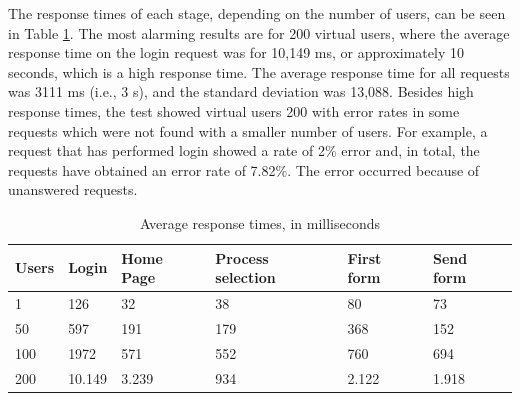 \documentclass[runningheads,a4paper]{llncs}
\begin{document}
{%


The response times of each stage, depending on the number of users, can be seen in Table \ref{tab:resultadoCarga}. The most alarming results are for 200 virtual users, where the average response time on the login request was for 10,149 ms, or approximately 10 seconds, which is a high response time. The average response time for all requests was 3111 ms (i.e., 3 s), and the standard deviation was 13,088. Besides high response times, the test showed virtual users 200 with error rates in some requests which were not found with a smaller number of users. For example, a request that has performed login showed a rate of 2\% error and, in total, the requests have obtained an error rate of 7.82\%. The error occurred because of unanswered requests.


\begin{table}
{\scriptsize
\centering
\begin{tabular}{p{2cm}|p{2cm}|p{2cm}|p{2cm}|p{2cm}|p{2cm}}
\hline
Users & Login & Home Page & Process selection & First form & Send form \\\hline
1 & 126 & 32 & 38 & 80 & 73\\\hline
50 & 597 & 191 & 179 & 368 & 152\\\hline
100 & 1972 & 571 & 552 & 760 & 694\\\hline
200 & 10.149 & 3.239 & 934 & 2.122 & 1.918\\\hline
\end{tabular}
}
\caption{Average response times, in milliseconds}
\label{tab:resultadoCarga}
\end{table}


}
\end{document}
